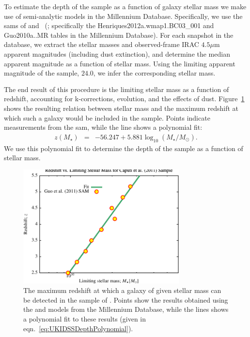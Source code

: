To estimate the depth of the \cite{caputi_stellar_2011} sample as a function of galaxy stellar mass we make use of semi-analytic models in the Millennium Database. Specifically, we use the \glspl{sam} of \cite{henriques_confronting_2012} and \citeauthor{guo_dwarf_2011}~(\citeyear{guo_dwarf_2011}; specifically the {\normalfont \ttfamily Henriques2012a.wmap1.BC03\_001} and {\normalfont \ttfamily Guo2010a..MR} tables in the Millennium Database). For each snapshot in the database, we extract the stellar masses and observed-frame IRAC $4.5\mu$m apparent magnitudes (including dust extinction), and determine the median apparent magnitude as a function of stellar mass. Using the limiting apparent magnitude of the \cite{caputi_stellar_2011} sample, $24.0$, we infer the corresponding stellar mass.

The end result of this procedure is the limiting stellar mass as a function of redshift, accounting for k-corrections, evolution, and the effects of dust. Figure~\ref{fig:UKIDSSUDSDepthFit} shows the resulting relation between stellar mass and the maximum redshift at which such a galaxy would be included in the sample. Points indicate measurements from the \gls{sam}, while the line shows a polynomial fit:
\begin{eqnarray}
 z(M_\star) &=& -56.247 + 5.881 \log_{10}(M_\star/M_\odot).
 \label{eq:UKIDSSDepthPolynomial}
\end{eqnarray}
We use this polynomial fit to determine the depth of the sample as a function of stellar mass.

\begin{figure}
 \begin{center}
 \includegraphics[width=85mm,trim=0mm 0mm 0mm 4mm,clip]{Plots/DataAnalysis/UKIDSSUDSMassLuminosityRelation.pdf}
 \end{center}
 \caption{The maximum redshift at which a galaxy of given stellar mass can be detected in the sample of \protect\cite{caputi_stellar_2011}. Points show the results obtained using the \protect\cite{henriques_confronting_2012} and \protect\cite{guo_dwarf_2011} models from the Millennium Database, while the lines shows a polynomial fit to these results (given in eqn.~\ref{eq:UKIDSSDepthPolynomial}).}
 \label{fig:UKIDSSUDSDepthFit}
\end{figure}

